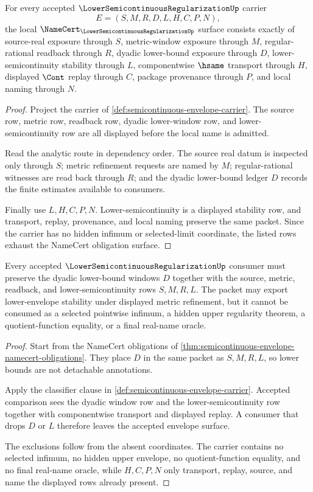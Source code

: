 \begin{theorem}
\label{thm:semicontinuous-envelope-namecert-obligations}
For every accepted $\LowerSemicontinuousRegularizationUp$ carrier
$$
E=(S,M,R,D,L,H,C,P,N),
$$
the local $\NameCert_{\LowerSemicontinuousRegularizationUp}$ surface consists exactly of source-real exposure through $S$, metric-window exposure through $M$, regular-rational readback through $R$, dyadic lower-bound exposure through $D$, lower-semicontinuity stability through $L$, componentwise $\hsame$ transport through $H$, displayed $\Cont$ replay through $C$, package provenance through $P$, and local naming through $N$.
\end{theorem}
\begin{proof}
Project the carrier of \autoref{def:semicontinuous-envelope-carrier}. The source row, metric row, readback row, dyadic lower-window row, and lower-semicontinuity row are all displayed before the local name is admitted.

Read the analytic route in dependency order. The source real datum is inspected only through $S$; metric refinement requests are named by $M$; regular-rational witnesses are read back through $R$; and the dyadic lower-bound ledger $D$ records the finite estimates available to consumers.

Finally use $L,H,C,P,N$. Lower-semicontinuity is a displayed stability row, and transport, replay, provenance, and local naming preserve the same packet. Since the carrier has no hidden infimum or selected-limit coordinate, the listed rows exhaust the NameCert obligation surface.
\end{proof}

\begin{theorem}
\label{thm:semicontinuous-envelope-lower-upper-stability}
Every accepted $\LowerSemicontinuousRegularizationUp$ consumer must preserve the dyadic lower-bound windows $D$ together with the source, metric, readback, and lower-semicontinuity rows $S,M,R,L$. The packet may export lower-envelope stability under displayed metric refinement, but it cannot be consumed as a selected pointwise infimum, a hidden upper regularity theorem, a quotient-function equality, or a final real-name oracle.
\end{theorem}
\begin{proof}
Start from the NameCert obligations of \autoref{thm:semicontinuous-envelope-namecert-obligations}. They place $D$ in the same packet as $S,M,R,L$, so lower bounds are not detachable annotations.

Apply the classifier clause in \autoref{def:semicontinuous-envelope-carrier}. Accepted comparison sees the dyadic window row and the lower-semicontinuity row together with componentwise transport and displayed replay. A consumer that drops $D$ or $L$ therefore leaves the accepted envelope surface.

The exclusions follow from the absent coordinates. The carrier contains no selected infimum, no hidden upper envelope, no quotient-function equality, and no final real-name oracle, while $H,C,P,N$ only transport, replay, source, and name the displayed rows already present.
\end{proof}

